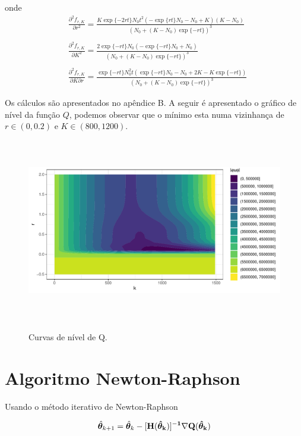 \documentclass[a4paper,12pt,twoside]{article}
\begin{document}
onde 
\begin{align*}
&\frac{\partial^2 f_{r,K}}{\partial r^2}=\frac{K\exp{\{-2rt \}}N_0t^2(-\exp{\{rt\}}N_0-N_0+K)(K-N_0)}{(N_0+(K-N_0)\exp{\{-rt\}})^3}\\\\
&\frac{\partial^2 f_{r,K}}{\partial K^2}=\frac{2\exp{\{-rt\}}N_0(-\exp{\{-rt\}}N_0+N_0)}{(N_0+(K-N_0)\exp{\{-rt\}})^3}\\\\
&\frac{\partial^2 f_{r,K}}{\partial K \partial r}=\frac{\exp{\{-rt\}}N_0^2t(\exp{\{-rt\}}N_0-N_0+2K-K\exp{\{-rt\}})}{(N_0+(K-N_0)\exp{\{-rt\}})^3}
\end{align*}

Os cálculos são apresentados no apêndice B. A seguir é apresentado o gráfico de nível da função $Q$, podemos observar que o mínimo esta numa vizinhança de $r \in (0,0.2)$ e $K \in (800,1200)$.

\begin{figure}[H]
  \centering
  {\includegraphics[width=16cm,height=8cm]{imgs/space.pdf}}
  \captionsetup{font=footnotesize,width=15cm}
  \caption{\small Curvas de nível de Q.}
\end{figure}

\newpage
\section{Algoritmo Newton-Raphson}

Usando o método iterativo de Newton-Raphson

\begin{align}
\hat{\bm{\theta}}_{k+1}=\hat{\bm{\theta}}_{k}-[\bf{H}(\hat{\bm{\theta}}_k)]^{-1}\nabla Q(\hat{\bm{\theta}}_k)
\end{align}
\end{document}
